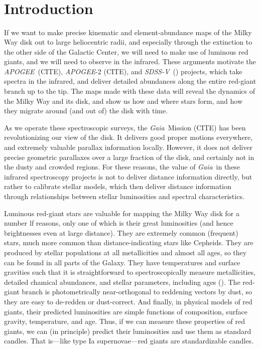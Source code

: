 \documentclass[modern]{aastex62}
\newcommand{\acronym}[1]{{\small{#1}}}
\newcommand{\project}[1]{\textsl{#1}}
\newcommand{\apogee}{\project{\acronym{APOGEE}}}
\newcommand{\gaia}{\project{Gaia}}
\newcommand{\sdssv}{\project{\acronym{SDSS-V}}}
\begin{document}

\section*{~}\clearpage
\section{Introduction} \label{sec:intro}

If we want to make precise kinematic and element-abundance maps
of the Milky Way disk out to large heliocentric radii,
and especially through the extinction to the other side of the Galactic Center, we will
need to make use of luminous red giants, and we will need to observe in
the infrared.
These arguments motivate the \apogee\ (CITE), \apogee-2 (CITE), and \sdssv\ (\citealt{sdssv})
projects, which take spectra in the infrared, and deliver detailed abundances
along the entire red-giant branch up to the tip.
The maps made with these data will reveal the dynamics of the Milky Way and its disk,
and show us how and where stars form, and how they migrate around (and out of) the
disk with time.

As we operate these spectroscopic surveys,
the \gaia\ Mission (CITE) has been revolutionizing our view of the disk.
It delivers good proper motions everywhere,
and extremely valuable parallax information
locally.
However, it does not deliver precise geometric parallaxes over a large fraction of
the disk, and certainly not in the dusty and crowded regions.
For these reasons, the value of \gaia\ in these infrared spectroscopy projects is not
to deliver distance information directly, but rather to calibrate stellar models,
which then deliver distance information through relationships between stellar
luminosities and spectral characteristics.

Luminous red-giant stars are valuable for mapping the Milky Way disk for a number
lf reasons, only one of which is their great luminosities (and hence brightnesses
even at large distance).
They are extremely common (frequent) stars, much more common than distance-indicating
stars like Cepheids.
They are produced by stellar populations at all metallicities and almost all ages,
so they can be found in all parts of the Galaxy.
They have temperatures and surface gravities such that it is
straightforward to spectroscopically measure metallicities,
detailed chamical abundances, and stellar parameters, including ages (\citealt{martig, nessage}).
The red-giant branch is photometrically near-orthogonal to reddening vectors by dust,
so they are easy to de-redden or dust-correct.
And finally, in physical models of red giants, their predicted luminosities are simple
functions of composition, surface gravity, temperature, and age.
Thus, if we can measure these properties of red giants, we can (in principle) predict
their luminosities and use them as standard candles.
That is---like type Ia supernovae---red giants are standardizable candles.
\end{document}
